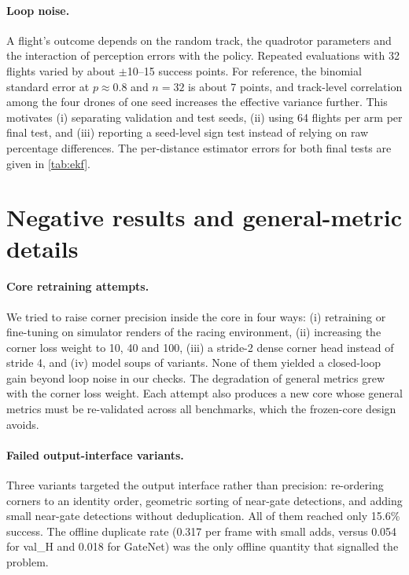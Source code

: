 \documentclass[10pt,twocolumn,letterpaper]{article}
\begin{document}
\paragraph{Loop noise.}
A flight's outcome depends on the random track, the quadrotor parameters and the interaction of perception errors with the policy. Repeated evaluations with 32 flights varied by about $\pm$10--15 success points. For reference, the binomial standard error at $p\approx0.8$ and $n=32$ is about 7 points, and track-level correlation among the four drones of one seed increases the effective variance further. This motivates (i) separating validation and test seeds, (ii) using 64 flights per arm per final test, and (iii) reporting a seed-level sign test instead of relying on raw percentage differences. The per-distance estimator errors for both final tests are given in \cref{tab:ekf}.

\section{Negative results and general-metric details}
\label{sec:app_neg}
\paragraph{Core retraining attempts.}
We tried to raise corner precision inside the core in four ways: (i) retraining or fine-tuning on simulator renders of the racing environment, (ii) increasing the corner loss weight to 10, 40 and 100, (iii) a stride-2 dense corner head instead of stride 4, and (iv) model soups of variants. None of them yielded a closed-loop gain beyond loop noise in our checks. The degradation of general metrics grew with the corner loss weight. Each attempt also produces a new core whose general metrics must be re-validated across all benchmarks, which the frozen-core design avoids.

\paragraph{Failed output-interface variants.}
Three variants targeted the output interface rather than precision: re-ordering corners to an identity order, geometric sorting of near-gate detections, and adding small near-gate detections without deduplication. All of them reached only 15.6\% success. The offline duplicate rate (0.317 per frame with small adds, versus 0.054 for val\_H and 0.018 for GateNet) was the only offline quantity that signalled the problem.
\end{document}
